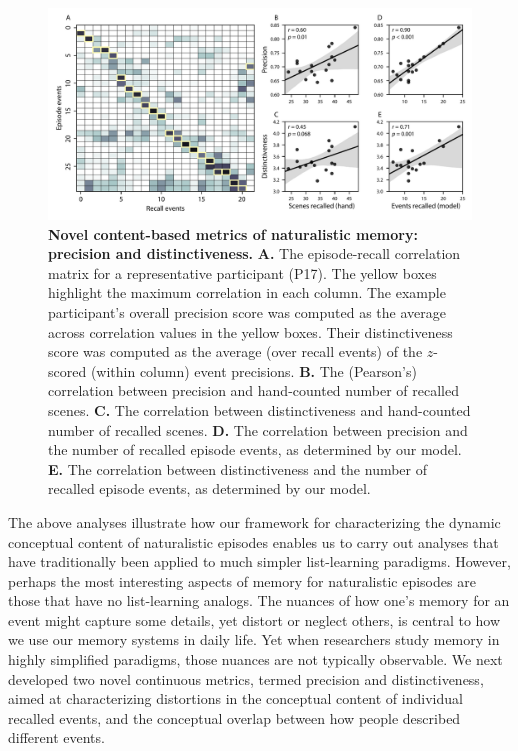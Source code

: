 \documentclass[10pt]{article}
\begin{document}
\begin{figure}[tp]
  \centering
  \includegraphics[width=1\textwidth]{figs/precision_distinctiveness}
  \caption{\small \textbf{Novel content-based metrics of naturalistic memory: precision and distinctiveness.} \textbf{A.} The episode-recall correlation matrix for a representative participant (P17).  The yellow boxes highlight the maximum correlation in each column.  The example participant's overall precision score was computed as the average across correlation values in the yellow boxes.  Their distinctiveness score was computed as the average (over recall events) of the $z$-scored (within column) event precisions. \textbf{B.} The (Pearson's) correlation between precision and hand-counted number of recalled scenes.  \textbf{C.} The correlation between distinctiveness and hand-counted number of recalled scenes. \textbf{D.} The correlation between precision and the number of recalled episode events, as determined by our model. \textbf{E.} The correlation between distinctiveness and the number of recalled episode events, as determined by our model.}
  \label{fig:precision-distinctiveness}
\end{figure}

The above analyses illustrate how our framework for characterizing the dynamic conceptual content of naturalistic episodes enables us to carry out analyses that have traditionally been applied to much simpler list-learning paradigms.  However, perhaps the most interesting aspects of memory for naturalistic episodes are those that have no list-learning analogs.  The nuances of how one's memory for an event might capture some details, yet distort or neglect others, is central to how we use our memory systems in daily life.  Yet when researchers study memory in highly simplified paradigms, those nuances are not typically observable.  We next developed two novel continuous metrics, termed precision and distinctiveness, aimed at characterizing distortions in the conceptual content of individual recalled events, and the conceptual overlap between how people described different events.
\end{document}
